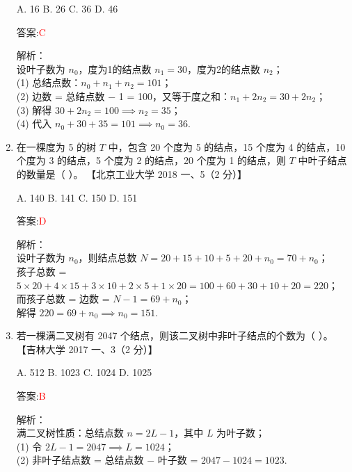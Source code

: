 \documentclass[lang=cn,newtx,10pt,scheme=chinese]{../../../elegantbook}
\begin{document}
\begin{enumerate}
    A. 16  
    B. 26  
    C. 36  
    D. 46

    答案:\textcolor{red}{C}

    解析：\\
    设叶子数为 $n_0$，度为1的结点数 $n_1=30$，度为2的结点数 $n_2$；\\
    (1) 总结点数：$n_0 + n_1 + n_2 = 101$；\\
    (2) 边数 = 总结点数 − 1 = 100，又等于度之和：$n_1 + 2n_2 = 30 + 2n_2$；\\
    (3) 解得 $30 + 2n_2 = 100 \implies n_2 = 35$；\\
    (4) 代入 $n_0 + 30 + 35 = 101 \implies n_0 = 36$.\\

\item 在一棵度为 5 的树 $T$ 中，包含 20 个度为 5 的结点，15 个度为 4 的结点，10 个度为 3 的结点，5 个度为 2 的结点，20 个度为 1 的结点，则 $T$ 中叶子结点的数量是（ ）。  
    【北京工业大学 2018 一、5（2 分）】

    A. 140  
    B. 141  
    C. 150  
    D. 151

    答案:\textcolor{red}{D}

    解析：\\
    设叶子数为 $n_0$，则结点总数 $N = 20+15+10+5+20 + n_0 = 70 + n_0$；\\
    孩子总数 = $5\times20 + 4\times15 + 3\times10 + 2\times5 + 1\times20 = 100+60+30+10+20 = 220$；\\
    而孩子总数 = 边数 = $N - 1 = 69 + n_0$；\\
    解得 $220 = 69 + n_0 \implies n_0 = 151$.\\

\item 若一棵满二叉树有 2047 个结点，则该二叉树中非叶子结点的个数为（ ）。  
    【吉林大学 2017 一、3（2 分）】

    A. 512  
    B. 1023  
    C. 1024  
    D. 1025

    答案:\textcolor{red}{B}

    解析：\\
    满二叉树性质：总结点数 $n = 2L - 1$，其中 $L$ 为叶子数；\\
    (1) 令 $2L - 1 = 2047 \implies L = 1024$；\\
    (2) 非叶子结点数 = 总结点数 − 叶子数 = $2047 - 1024 = 1023$.\\




\end{enumerate}
\end{document}
